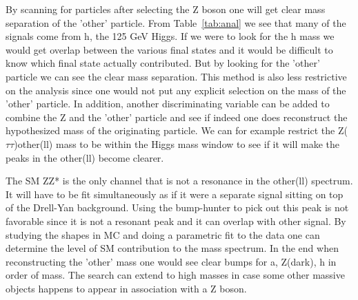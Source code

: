 \documentclass[11pt]{article}
\newcommand{\too}{$\rightarrow$}
\begin{document}

By scanning for particles after selecting the Z boson one will get clear mass separation of the 'other' particle.  From Table~\ref{tab:anal} we see that many of the signals come from h, the 125 GeV Higgs.  If we were to look for the h mass we would get overlap between the various final states and it would be difficult to know which final
state actually contributed.  But by looking for the 'other' particle we can see the clear mass separation.  This method is also less restrictive on the analysis since one would not put any explicit selection on the mass
of the 'other' particle. In addition, another discriminating variable can be added to combine the Z and the 'other' particle and see if indeed one does reconstruct the hypothesized mass of the originating particle.  We can for example restrict the Z($\tau\tau$)other(ll) mass to be within the Higgs mass window to see if it will make the peaks in the other(ll) become clearer.  





The SM ZZ* is the only channel that is not a resonance in the other(ll) spectrum.  It will have to be fit simultaneously as if it were a separate signal sitting on top of the Drell-Yan background.  Using the
bump-hunter to pick out this peak is not favorable since it is not a resonant peak and it can overlap with other signal.  By studying the shapes in MC and doing a parametric fit to the data one can determine the level of SM contribution to the mass spectrum.
In the end when reconstructing the 'other' mass one would see clear bumps for a, Z(dark), h in order of mass. The search can extend to high masses in case some other massive objects happens to appear in association with a Z boson.  
\end{document}
